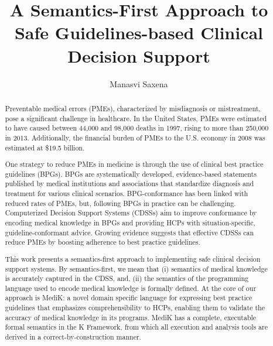 \documentclass{uiucthesis2021}
\begin{document}
\title{A Semantics-First Approach to Safe Guidelines-based Clinical Decision Support}
\author{Manasvi Saxena}
\phdthesis
{}
\maketitle

\frontmatter

\begin{abstract}
  Preventable medical errors (PMEs), characterized by misdiagnosis or mistreatment,
  pose a significant challenge in healthcare.
  In the United States, PMEs were estimated to have caused between
  44,000 and 98,000 deaths in 1997,
  rising to more than 250,000 in 2013. Additionally, the
  financial burden of PMEs to the U.S. economy in 2008 was estimated at \$19.5 billion.

  One strategy to reduce PMEs in medicine is through the use of
  clinical best practice guidelines (BPGs). BPGs are systematically developed,
  evidence-based statements published by medical institutions and associations
  that standardize diagnosis and treatment for various clinical scenarios.
  BPG-conformance has been linked with reduced rates of PMEs, but,
  following BPGs in practice can be challenging.
  Computerized Decision Support Systems (CDSSs) aim to improve conformance
  by encoding medical knowledge in BPGs and providing HCPs with
  situation-specific, guideline-conformant advice.
  Growing evidence suggests that
  effective CDSSs can reduce PMEs by boosting adherence to best practice guidelines.

  This work presents a semantics-first approach to implementing safe clinical
  decision support systems. By semantics-first,
  we mean that (i) semantics of medical knowledge is
  accurately captured in the CDSS, and, (ii) the semantics of the programming language
  used to encode medical knowledge is formally defined.
  At the core of our approach is MediK: a novel domain specific language
  for expressing best practice guidelines that emphasizes comprehensibility
  to HCPs, enabling them to validate the accuracy of medical knowledge in its
  programs. MediK has a complete, executable formal semantics in the K Framework,
  from which all execution and analysis tools are derived in a
  correct-by-construction manner.


\end{abstract}
\end{document}
